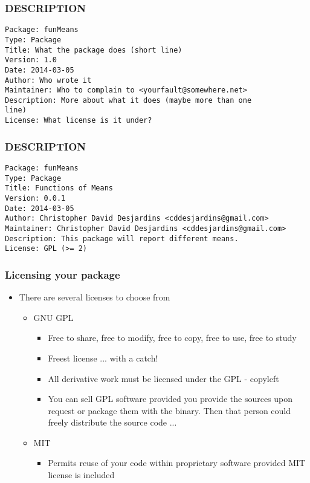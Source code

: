 \documentclass[xcolor=svgnames]{beamer}\usepackage[]{graphicx}\usepackage[]{color}
\begin{document}
\begin{frame}[fragile]
\frametitle{DESCRIPTION}
\begin{verbatim}
Package: funMeans
Type: Package
Title: What the package does (short line)
Version: 1.0
Date: 2014-03-05
Author: Who wrote it
Maintainer: Who to complain to <yourfault@somewhere.net>
Description: More about what it does (maybe more than one
line)
License: What license is it under?
\end{verbatim}
\end{frame}

\begin{frame}[fragile]
\frametitle{DESCRIPTION}
\begin{footnotesize}
\begin{verbatim}
Package: funMeans
Type: Package
Title: Functions of Means
Version: 0.0.1
Date: 2014-03-05
Author: Christopher David Desjardins <cddesjardins@gmail.com>
Maintainer: Christopher David Desjardins <cddesjardins@gmail.com>
Description: This package will report different means.
License: GPL (>= 2)
\end{verbatim}
\end{footnotesize}
\end{frame}

\begin{frame}[fragile]
  \frametitle{Licensing your package}
  \begin{itemize}
  \item There are several licenses to choose from
    \begin{itemize}
    \item GNU GPL
      \begin{itemize}
      \item Free to share, free to modify, free to copy, free to use, free to study
      \item Freest license ... with a catch!
      \item All derivative work must be licensed under the GPL - copyleft
      \item You can sell GPL software provided you provide the sources upon request or package them with the binary. Then that person could freely distribute the source code ...  
      \end{itemize}
\item MIT
  \begin{itemize}
  \item Permits reuse of your code within proprietary software provided MIT license is included
  \end{itemize}

    \end{itemize}

  \end{itemize}
\end{frame}
\end{document}
